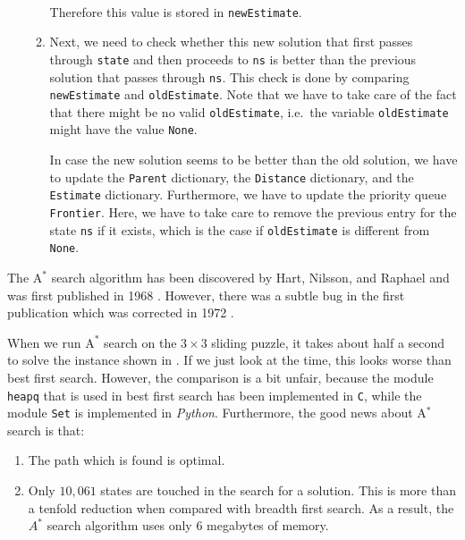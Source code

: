 \begin{enumerate}
\begin{enumerate}
            \\[0.2cm]
            Therefore this value is stored in \texttt{newEstimate}.
      \item Next, we need to check whether this new solution that first passes through \texttt{state} and
            then proceeds to \texttt{ns} is better than the previous solution that passes through
            \texttt{ns}.  This check is done by comparing \texttt{newEstimate} and
            \texttt{oldEstimate}.  Note that we have to take care of the fact that there might be no valid
            \texttt{oldEstimate}, i.e.~the variable \texttt{oldEstimate} might have the value \texttt{None}.

            In case the new solution seems to be better than the old solution, we have to update
            the \texttt{Parent} dictionary, the \texttt{Distance} dictionary, and the \texttt{Estimate}
            dictionary.  Furthermore, we have to update the priority queue \texttt{Frontier}.
            Here, we have to take care to remove the previous entry for the state
            \texttt{ns} if it exists, which is the case if \texttt{oldEstimate} is different from \texttt{None}.
      \end{enumerate}
\end{enumerate}
The $\mathrm{A}^*$ search algorithm has been discovered by Hart, Nilsson, and Raphael and was first published in
1968 \cite{hart:1968}.  However, there was a subtle bug in the first publication which was corrected
in 1972 \cite{hart:1972}.

When we run $\mathrm{A}^*$ search on the $3 \times 3$ sliding puzzle, it takes about half a second to solve the instance
shown in .  If we just look at the time, this looks worse than best first search.  
However, the comparison is a bit unfair, because the module \texttt{heapq} that is used in best first search
has been implemented  in \texttt{C}, while the module \texttt{Set} is implemented in \textsl{Python}.
Furthermore, the good news about A$^*$ search is that:
\begin{enumerate}
\item The path which is found is optimal.
\item Only $10,061$ states are touched in the search for a solution.  This is more than a tenfold 
      reduction when compared with breadth first search.  As a result, the $A^*$ search algorithm uses only 6
      megabytes of memory.
\end{enumerate}


